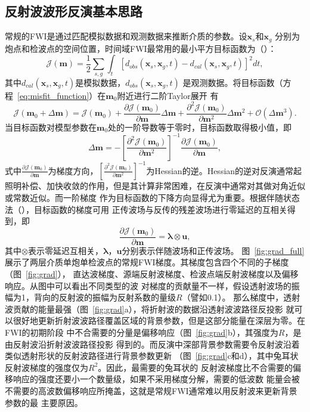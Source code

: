 \subsection{反射波波形反演基本思路}
\vspace{0.5cm}
常规的FWI是通过匹配模拟数据和观测数据来推断介质的参数。设$\mathbf{x}_s$和$\mathbf{x}_g$
分别为炮点和检波点的空间位置，时间域FWI最常用的最小平方目标函数为（）：
\begin{equation}
    \mathcal{J}(\mathbf{m})=\frac{1}{2}\sum_{s,g}\int_t[d_{obs}(\mathbf{x}_s,\mathbf{x}_g,t)
	        -d_{cal}(\mathbf{x}_s,\mathbf{x}_g,t)]^2dt,
	\label{eq:misfit_function}
\end{equation}
其中$d_{cal}(\mathbf{x}_s,\mathbf{x}_g,t)$是模拟数据，$d_{obs}(\mathbf{x}_s,\mathbf{x}_g,t)$
是观测数据。将目标函数（方程~\ref{eq:misfit_function}）在$\mathbf{m}_0$附近进行二阶Taylor展开
有
\begin{equation}
	\mathcal{J}(\mathbf{m}_0+\Delta\mathbf{m})=\mathcal{J}(\mathbf{m}_0)
	+\frac{\partial\mathcal{J}(\mathbf{m}_0)}{\partial\mathbf{m}}\Delta\mathbf{m}
	+\frac{\partial^2\mathcal{J}(\mathbf{m}_0)}{\partial\mathbf{m}^2}\Delta\mathbf{m}^2 
	+ \mathcal{O}(\Delta\mathbf{m}^3).
\end{equation}
当目标函数对模型参数在$\mathbf{m}_0$处的一阶导数等于零时，目标函数取得极小值，即
\begin{equation}
	\Delta\mathbf{m}=-[\frac{\partial^2\mathcal{J}(\mathbf{m}_0)}{\partial\mathbf{m}^2}]^{-1}
	\frac{\partial\mathcal{J}(\mathbf{m}_0)}{\partial\mathbf{m}},
\end{equation}
式中$\frac{\partial\mathcal{J}(\mathbf{m}_0)}{\partial\mathbf{m}}$为梯度方向，$[\frac{\partial^2
\mathcal{J}(\mathbf{m}_0)}{\partial\mathbf{m}^2}]^{-1}$为Hessian的逆。Hessian的逆对反演通常起
照明补偿、加快收敛的作用，但是其计算非常困难，在反演中通常对其做对角近似或常数近似。而一阶梯度
作为目标函数的下降方向显得尤为重要。根据伴随状态法（），目标函数的梯度可用
正传波场与反传的残差波场进行零延迟的互相关得到，即
\begin{equation}
	\frac{\partial\mathcal{J}(\mathbf{m}_0)}{\partial\mathbf{m}} = \mathbf{\lambda}\otimes\mathbf{u},
\end{equation}
其中$\otimes$表示零延迟互相关，$\mathbf{\lambda}$，$\mathbf{u}$分别表示伴随波场和正传波场。
图~\ref{fig:grad_full}展示了两层介质单炮单检波点的常规FWI梯度。其梯度包含四个不同的子梯度
（图~\ref{fig:grad}），
直达波梯度、源端反射波梯度、检波点端反射波梯度以及偏移响应。从图中可以看出不同类型的波
对梯度的贡献量不一样，假设透射波场的振幅为1，背向的反射波的振幅为反射系数的量级$R$（譬如0.1）。
那么梯度中，透射波贡献的能量最强（图~\ref{fig:grad}a），将折射波的数据沿透射波波路径反投影
就可以很好地更新折射波波路径覆盖区域的背景参数，但是这部分能量在深层为零。在FWI的初期阶段
中不合需要的分量是偏移响应（图~\ref{fig:grad}b），其强度为$R$，是由反射波沿折射波波路径投影
得到的。而反演中深部背景参数需要令反射波沿着类似透射形状的反射波路径进行背景参数更新
（图~\ref{fig:grad}c和d），其中兔耳状反射波梯度的强度仅为$R^2$。因此，最需要的兔耳状的
反射波梯度比不合需要的偏移响应的强度还要小一个数量级，如果不采用梯度分解，需要的低波数
能量会被不需要的高波数偏移响应所掩盖，这就是常规FWI通常难以用反射波来更新背景参数的最
主要原因。

